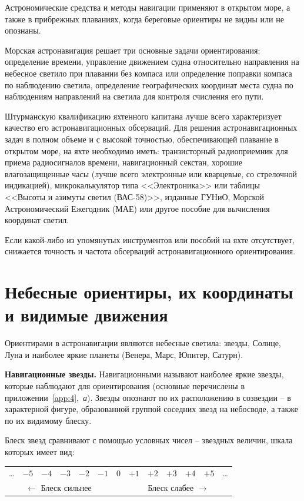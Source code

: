 \documentclass[a4paper, 12pt, twoside, final, book, russian, fittopage, cyremdash]{ncc}
\begin{document}
Астрономические средства и методы навигации применяют в открытом море, а также в прибрежных плаваниях, когда береговые ориентиры не видны или не опознаны.

Морская астронавигация решает три основные задачи ориентирования: определение времени, управление движением судна относительно направления на небесное светило при плавании без компаса или определение поправки компаса по наблюдению светила, определение географических координат места судна по наблюдениям направлений на светила для контроля счисления его пути.

Штурманскую квалификацию яхтенного капитана лучше всего характеризует качество его астронавигационных обсерваций. Для решения астронавигационных задач в полном объеме и с высокой точностью, обеспечивающей плавание в открытом море, на яхте необходимо иметь: транзисторный радиоприемник для приема радиосигналов времени, навигационный секстан, хорошие влагозащищенные часы (лучше всего электронные или кварцевые, со стрелочной индикацией), микрокалькулятор типа <<Электроника>> или таблицы <<Высоты и азимуты светил (ВАС-58)>>, изданные ГУНиО, Морской Астрономический Ежегодник (МАЕ) или другое пособие для вычисления координат светил.

Если какой-либо из упомянутых инструментов или пособий на яхте отсутствует, снижается точность и частота обсерваций астронавигационного ориентирования.

\section{Небесные ориентиры, их координаты и видимые движения}\label{sec:7-1}

Ориентирами в астронавигации являются небесные светила: звезды, Солнце, Луна и наиболее яркие планеты (Венера, Марс, Юпитер, Сатурн).

\textbf{Навигационные звезды.} Навигационными называют наиболее яркие звезды, которые наблюдают для ориентирования (основные перечислены в приложении~\ref{app:4},~\textit{а}). Звезды опознают по их расположению в созвездии \--- в характерной фигуре, образованной группой соседних звезд на небосводе, а также по их видимому блеску.

Блеск звезд сравнивают с помощью условных чисел \--- звездных величин, шкала которых имеет вид:

\begin{table}[h]
  \centering{}
  \begin{tabular}[c]{ccccccccccccc}
    \ldots & $-5$ & $-4$ & $-3$ & $-2$ & $-1$ & 0 & $+1$ & $+2$ & $+3$ & $+4$ & $+5$ & \ldots \\
    \multicolumn{6}{c}{$\longleftarrow$ Блеск сильнее} & & \multicolumn{6}{c}{Блеск слабее $\longrightarrow$} 
  \end{tabular}
\end{table}
\end{document}
